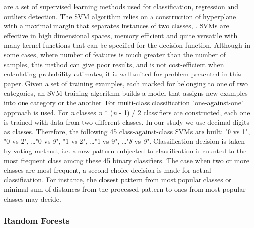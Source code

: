\documentclass{llncs}
\begin{document}
are a set of supervised learning methods used for classification, regression and outliers detection. The SVM algorithm relies on a construction of hyperplane with a maximal margin that separates instances of two classes, \cite{CortesVapnik1995}. SVMs are effective in high dimensional spaces, memory efficient and quite versatile with many kernel functions that can be specified for the decision function. Although in some cases, where number of features is much greater than the number of samples, this method can give poor results, and is not cost-efficient when calculating probability estimates, it is well suited for problem presented in this paper. Given a set of training examples, each marked for belonging to one of two categories, an SVM training algorithm builds a model that assigns new examples into one category or the another. For multi-class classification "one-against-one" approach is used. For \textit{n} classes \textit{n} * (\textit{n} - 1) / 2 classifiers are constructed, each one is trained with data from two different classes. In our study we use decimal digits as classes. Therefore, the following 45 class-against-class SVMs are built: "0 vs 1", "0 vs 2", \dots "0 vs \textit{9}", "1 vs 2", \dots "1 vs 9",  \dots "\textit{8} vs \textit{9}". Classification decision is taken by voting method, i.e. a new pattern subjected to classification is counted to the most frequent class among these 45 binary classifiers. The case when two or more classes are most frequent, a second choice decision is made for actual classification. For instance, the closest pattern from most popular classes or minimal sum of distances from the processed pattern to ones from most popular classes may decide.  

\vspace{-9pt}
\subsubsection{Random Forests}
\end{document}
